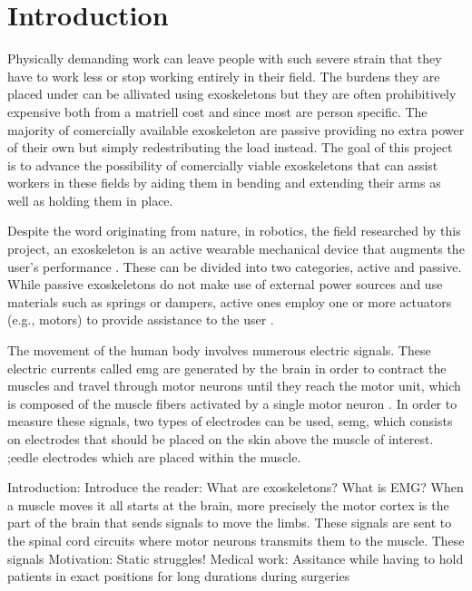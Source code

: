\section{Introduction}
\label{section:intro}

Physically demanding work can leave people with such severe strain that they have to work less or stop working entirely in 
their field\cite{WorkDemands}. The burdens they are placed under can be allivated using exoskeletons but they are often 
prohibitively expensive both from a matriell cost and since most are person specific. The majority of comercially available 
exoskeleton are passive providing no extra power of their own but simply redestributing the load instead. The goal of this 
project is to advance the possibility of comercially viable exoskeletons that can assist workers in these fields by aiding 
them in bending and extending their arms as well as holding them in place.

Despite the word originating from nature, in robotics, the field researched by this project, an exoskeleton is an active wearable 
mechanical device that augments the user's performance \cite{ExoDefinition}. These can be divided into two categories, active and passive. 
While passive exoskeletons do not make use of external power sources and use materials such as springs or dampers, active ones employ 
one or more actuators (e.g., motors) to provide assistance to the user \cite{PassiveActiveExo}.

The movement of the human body involves numerous electric signals. These electric currents called \ac{emg} are generated by the brain
in order to contract the muscles and travel through motor neurons until they reach the motor unit, which is composed of the muscle fibers
activated by a single motor neuron \cite{EMGgen}. In order to measure these signals, two types of electrodes can be used, \ac{semg}, 
which consists on electrodes that should be placed on the skin above the muscle of interest.
;eedle electrodes which are placed within the muscle. 

Introduction:
    Introduce the reader:
        What are exoskeletons?
        What is EMG?
        When a muscle moves it all starts at the brain, more precisely the motor cortex is the part of the brain that sends signals to move the limbs. These signals are sent 
        to the spinal cord circuits where motor neurons transmits them to the muscle.\cite{Motorcortex} These signals 
    Motivation:
        Static struggles!
            Medical work:
                Assitance while having to hold patients in exact positions for long durations during surgeries

